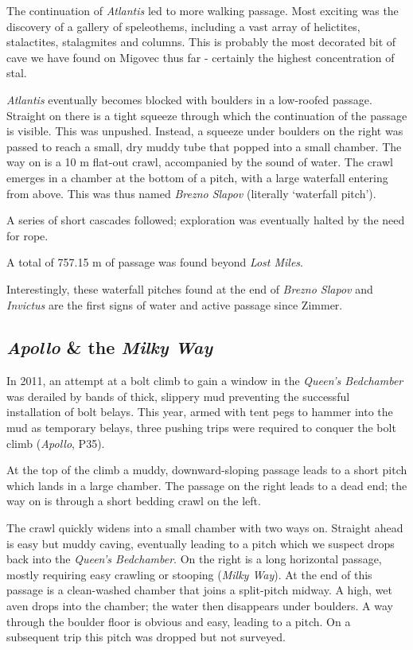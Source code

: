 The continuation of \emph{Atlantis} led to more walking passage. Most
exciting was the discovery of a gallery of speleothems, including a vast
array of helictites, stalactites, stalagmites and columns. This is
probably the most decorated bit of cave we have found on Migovec thus
far - certainly the highest concentration of stal.

\emph{Atlantis} eventually becomes blocked with boulders in a low-roofed
passage. Straight on there is a tight squeeze through which the
continuation of the passage is visible. This was unpushed. Instead, a
squeeze under boulders on the right was passed to reach a small, dry
muddy tube that popped into a small chamber. The way on is a 10 m
flat-out crawl, accompanied by the sound of water. The crawl emerges in
a chamber at the bottom of a pitch, with a large waterfall entering from
above. This was thus named \emph{Brezno Slapov} (literally `waterfall
pitch').

A series of short cascades followed; exploration was eventually halted
by the need for rope.

A total of 757.15 m of passage was found beyond \emph{Lost Miles}.

Interestingly, these waterfall pitches found at the end of \emph{Brezno
Slapov} and \emph{Invictus} are the first signs of water and active
passage since Zimmer.

\hypertarget{apollo-the-milky-way}{%
\subsection{\texorpdfstring{\emph{Apollo} \& the \emph{Milky
Way}}{Apollo \& the Milky Way}}\label{apollo-the-milky-way}}

In 2011, an attempt at a bolt climb to gain a window in the
\emph{Queen's Bedchamber} was derailed by bands of thick, slippery mud
preventing the successful installation of bolt belays. This year, armed
with tent pegs to hammer into the mud as temporary belays, three pushing
trips were required to conquer the bolt climb (\emph{Apollo}, P35).

At the top of the climb a muddy, downward-sloping passage leads to a
short pitch which lands in a large chamber. The passage on the right
leads to a dead end; the way on is through a short bedding crawl on the
left.

The crawl quickly widens into a small chamber with two ways on. Straight
ahead is easy but muddy caving, eventually leading to a pitch which we
suspect drops back into the \emph{Queen's Bedchamber}. On the right is a
long horizontal passage, mostly requiring easy crawling or stooping
(\emph{Milky Way}). At the end of this passage is a clean-washed chamber
that joins a split-pitch midway. A high, wet aven drops into the
chamber; the water then disappears under boulders. A way through the
boulder floor is obvious and easy, leading to a pitch. On a subsequent
trip this pitch was dropped but not surveyed.

